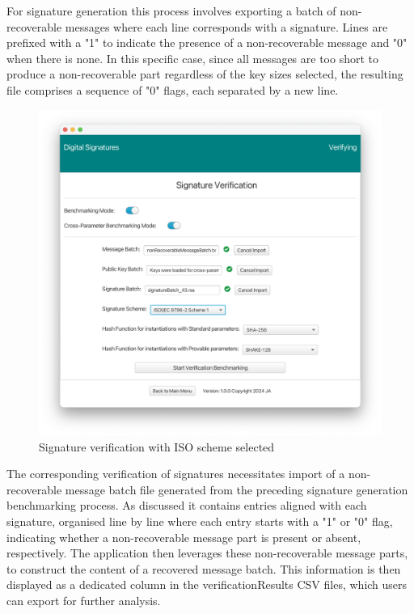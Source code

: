 \documentclass[]{final_report}
\theoremstyle{definition}
\begin{document}
For signature generation this process involves exporting a batch of non-recoverable messages where each line corresponds with a signature. Lines are prefixed with a "1" to indicate the presence of a non-recoverable message and "0" when there is none. In this specific case, since all messages are too short to produce a non-recoverable part regardless of the key sizes selected, the resulting file comprises a sequence of "0" flags, each separated by a new line.


\begin{figure}[H]
    \centering
    \includegraphics[width=\textwidth]{main_pictures/ui/verifying/verifying10.png}
    \caption{Signature verification with ISO scheme selected}
\end{figure}

The corresponding verification of signatures necessitates import of a non-recoverable message batch file generated from the preceding signature generation benchmarking process. As discussed it contains entries aligned with each signature, organised line by line where each entry starts with a "1" or "0" flag, indicating whether a non-recoverable message part is present or absent, respectively. The application then leverages these non-recoverable message parts, to construct the content of a recovered message batch. This information is then displayed as a dedicated column in the verificationResults CSV files, which users can export for further analysis.
\end{document}
